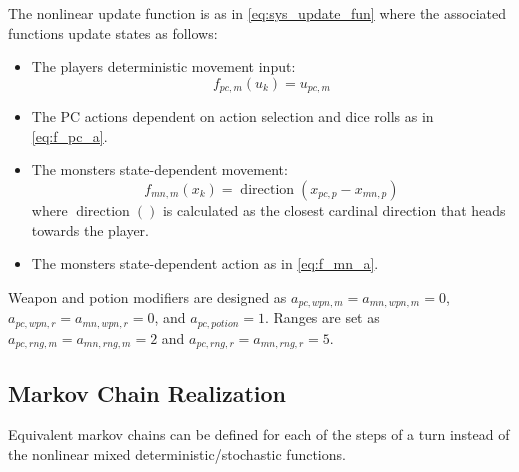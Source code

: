 \documentclass[letterpaper, 10 pt, conference]{ieeeconf}
\begin{document}
The nonlinear update function is as in \eqref{eq:sys_update_fun}
where the associated functions update states as follows: 
\begin{itemize}
    \item The players deterministic movement input: \[
        f_{pc,m}(u_k) = u_{pc,m}
    \]
    \item The PC actions dependent on action selection and dice rolls as in \eqref{eq:f_pc_a}. 


    \item The monsters state-dependent movement:\[
        f_{mn,m}(x_k) = \operatorname{direction}(x_{pc,p} - x_{mn,p})
    \] where $\operatorname{direction}()$ is calculated as the closest cardinal direction that heads towards the player.
    \item The monsters state-dependent action as in \eqref{eq:f_mn_a}.
\end{itemize}


Weapon and potion modifiers are designed as $a_{pc,wpn,m} = a_{mn,wpn,m} = 0$, $a_{pc,wpn,r} = a_{mn,wpn,r} = 0$, and $a_{pc,potion} = 1$.
Ranges are set as $a_{pc,rng,m}= a_{mn,rng,m} = 2$ and $ a_{pc,rng,r} =  a_{mn,rng,r} = 5$.

\subsection{Markov Chain Realization}
Equivalent markov chains can be defined for each of the steps of a turn instead of the nonlinear mixed deterministic/stochastic functions. 
\end{document}
